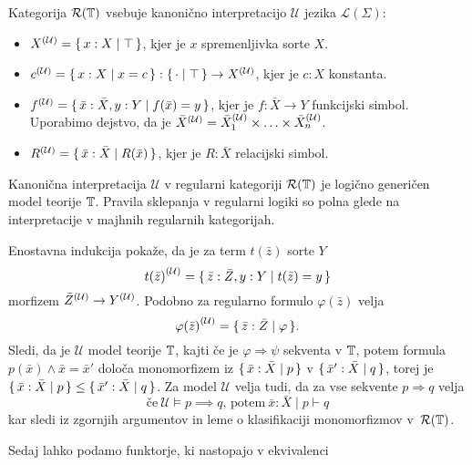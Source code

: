 \documentclass[../kategoricna_logika.tex]{subfiles}
\begin{document}
\begin{definicija}
  Kategorija $\mathcal{R}(\T)$ vsebuje kanonično interpretacijo
  $\mathcal{U}$ jezika $\mathcal{L}(\Sigma)$:
  \begin{itemize}
  \item $\interp[\mathcal{U}]{X} = \set{x:X \mid  \top}$, kjer je
    $x$ spremenljivka sorte $X$.
  \item
    $\interp[\mathcal{U}]{c} = \set{x:X \mid  x = c} :
    \set{\cdot \mid  \top} \to \interp[\mathcal{U}]{X}$, kjer je
    $c:X$ konstanta.
  \item
    $\interp[\mathcal{U}]{f} = \set{\bar{x}:\bar{X},y:Y \mid  f(\bar{x})
      = y}$, kjer je $f : \bar{X}\to Y$ funkcijski simbol. Uporabimo
    dejstvo, da je
    $\bar{X}^{(\mathcal{U})} = \interp[\mathcal{U}]{\bar{X}_1} \times
    \ldots \times \interp[\mathcal{U}]{\bar{X}_n}$.
  \item
    $\interp[\mathcal{U}]{R} = \set{\bar{x}:\bar{X} \mid  R(\bar{x})}$,
    kjer je $R : \bar{X}$ relacijski simbol.
  \end{itemize}
\end{definicija}
\begin{izrek}\label{izrek:logicno-genericen-model-regularne-logike}
  Kanonična interpretacija $\mathcal{U}$ v regularni kategoriji
  $\mathcal{R}(\T)$ je logično generičen model teorije $\T$. Pravila
  sklepanja v regularni logiki so polna glede na interpretacije v
  majhnih regularnih kategorijah.
\end{izrek}
\begin{dokaz}
  Enostavna indukcija pokaže, da je za term $t(\bar{z})$ sorte $Y$
$$\caninterp{t(\bar{z})} = \set{\bar{z}:\bar{Z},y:Y \mid  t(\bar{z}) = y}$$
morfizem $\caninterp{\bar{Z}} \to \caninterp{Y}$.
Podobno za regularno
formulo $\varphi(\bar{z})$ velja
$$\caninterp{\varphi(\bar{z})} = \set{\bar{z}:\bar{Z} \mid  \varphi}.$$
Sledi, da je $\mathcal{U}$ model teorije $\T$, kajti če je
$\varphi \Rightarrow \psi$ sekventa v $\T$, potem formula
$p(\bar{x}) \wedge \bar{x}= \bar{x}'$ določa monomorfizem iz
$\set{\bar{x}:\bar{X} \mid  p}$ v $\set{\bar{x}':\bar{X} \mid  q}$, torej
je $\set{\bar{x}:\bar{X} \mid  p} \leq \set{\bar{x}':{\bar{X}} \mid  q}$.
Za model $\mathcal{U}$ velja tudi, da za vse sekvente
$p \Rightarrow q$ velja
$$\text{če} \ \mathcal{U} \models p \implies q \text{, potem} \ \bar{x}:\bar{X} \mid p \vdash q$$
kar sledi iz zgornjih argumentov in leme o klasifikaciji monomorfizmov
v~$\mathcal{R}(\T)$.
\end{dokaz}
Sedaj lahko podamo funktorje, ki nastopajo v ekvivalenci
\end{document}
